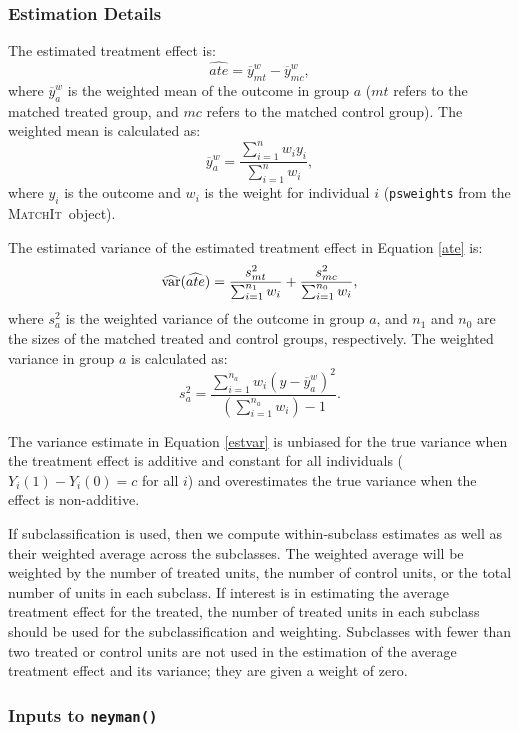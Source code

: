 \documentclass[oneside,letterpaper,titlepage]{article}
\newcommand{\MatchIt}{\textsc{MatchIt}}
\begin{document}
\subsubsection{Estimation Details}

The estimated treatment effect is:
\begin{equation}
\label{ate} 
\widehat{ate} = \overline{y}_{mt}^w-\overline{y}_{mc}^w,
\end{equation}
where $\overline{y}_a^w$ is the weighted mean of the outcome in group
$a$ ($mt$ refers to the matched treated group, and $mc$ refers to the
matched control group).  The weighted mean is calculated as:
$$\overline{y}_a^w = \frac{\sum_{i=1}^n w_i y_i}{\sum_{i=1}^n w_i},$$
where $y_i$ is the outcome and $w_i$ is the weight for individual $i$
({\tt psweights} from the \MatchIt\ object).

The estimated variance of the estimated treatment effect in Equation
\eqref{ate} is:
\begin{equation}
\label{estvar}
\widehat{{\rm var}}(\widehat{ate}) = \frac{s_{mt}^2}{\sum_{i=1}^{n_1} w_i} + \frac{s_{mc}^2}{\sum_{i=1}^{n_0} w_i},
\end{equation}
where $s_a^2$ is the weighted variance of the outcome in group $a$,
and $n_1$ and $n_0$ are the sizes of the matched treated and control
groups, respectively.  The weighted variance in group $a$ is
calculated as:
$$s^2_{a} = \frac{\sum_{i=1}^{n_a} w_i
  (y-\overline{y}_a^w)^2}{(\sum_{i=1}^{n_a} w_i) - 1}.$$

The variance estimate in Equation \eqref{estvar} is unbiased for the
true variance when the treatment effect is additive and constant for
all individuals ($Y_i(1)-Y_i(0)=c$ for all $i$) and overestimates the
true variance when the effect is non-additive.

If subclassification is used, then we compute within-subclass
estimates as well as their weighted average across the subclasses.
The weighted average will be weighted by the number of treated units,
the number of control units, or the total number of units in each
subclass.  If interest is in estimating the average treatment effect
for the treated, the number of treated units in each subclass should
be used for the subclassification and weighting.  Subclasses with
fewer than two treated or control units are not used in the estimation
of the average treatment effect and its variance; they are given a
weight of zero.

\subsubsection{Inputs to {\tt neyman()}}
\end{document}
